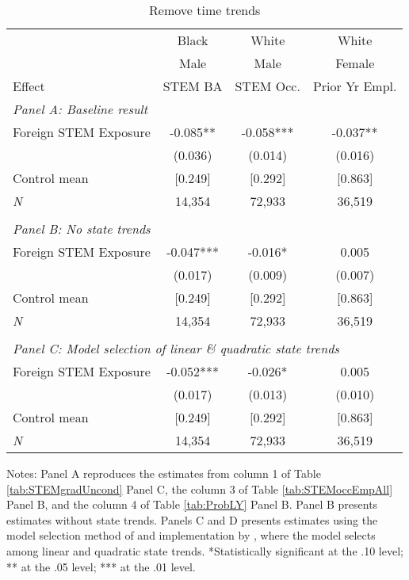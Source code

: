 \begin{table}[ht]
\caption{Remove time trends}
\label{tab:ta0}
\centering
\begin{threeparttable}
\begin{tabular}{lccc}
\toprule 
       & Black           & White        & White       \\
       & Male            & Male         & Female      \\
Effect & STEM BA         & STEM Occ.    & Prior Yr Empl.\\
\midrule 
\multicolumn{4}{l}{\emph{Panel A: Baseline result}}\\ 
Foreign STEM Exposure & -0.085** & -0.058*** & -0.037** \\ 
 &  (0.036)        & (0.014)        & (0.016) \\ 
Control mean &  [0.249]        & [0.292]       & [0.863] \\ 
\emph{N} &     14,354          &    72,933          &    36,519 \\ 
                         &                              &                              &\\
\multicolumn{4}{l}{\emph{Panel B: No state trends}}\\ 
Foreign STEM Exposure & -0.047*** & -0.016* & 0.005  \\ 
 &  (0.017)        & (0.009)        & (0.007) \\ 
Control mean &  [0.249]        & [0.292]       & [0.863] \\ 
\emph{N} &     14,354          &    72,933          &    36,519 \\ 
                         &                              &                              &\\
\multicolumn{4}{l}{\emph{Panel C: Model selection of linear \& quadratic state trends}}\\ 
Foreign STEM Exposure & -0.052*** & -0.026* & 0.005  \\ 
 &  (0.017)        & (0.013)        & (0.010) \\ 
Control mean &  [0.249]        & [0.292]       & [0.863] \\ 
\emph{N} &     14,354          &    72,933          &    36,519 \\ 
\bottomrule 
\end{tabular} 
\footnotesize Notes: Panel A reproduces the estimates from column 1 of Table \ref{tab:STEMgradUncond} Panel C, the column 3 of Table \ref{tab:STEMoccEmpAll} Panel B, and the column 4 of Table \ref{tab:ProbLY} Panel B. Panel B presents estimates without state trends. Panels C and D presents estimates using the model selection method of \citet{belloni_al2014} and implementation by \citet{pdslasso18}, where the model selects among linear and quadratic state trends. *Statistically significant at the .10 level; ** at the .05 level; *** at the .01 level.
\end{threeparttable} 
\end{table} 
